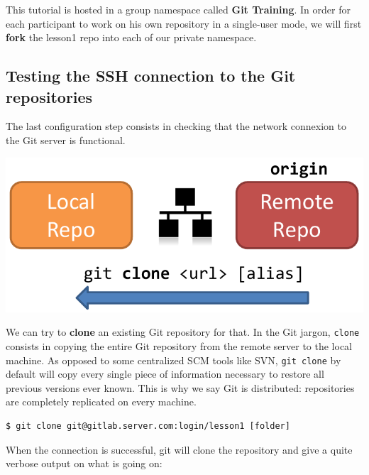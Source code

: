 \documentclass{tufte-handout}
\begin{document}
This tutorial is hosted in a group namespace called \textbf{Git Training}.
In order for each participant to work on his own repository in a single-user mode, we will first \textbf{fork} the lesson1 repo into each of our private namespace.

\subsection{Testing the SSH connection to the Git repositories}

The last configuration step consists in checking  that the network connexion to the Git server is functional.
\begin{marginfigure}%
  \centering
  \includegraphics[width=\linewidth]{gitclone-schema.pdf}
  \label{fig:gitclone}
\end{marginfigure}
We can try to \textbf{clone} an existing Git repository for that.
In the Git jargon, \texttt{clone} consists in copying the entire Git repository from the remote server to the local machine.
As opposed to some centralized SCM tools like SVN, \texttt{git clone} by default will copy every single piece of information necessary to restore all previous versions ever known.
This is why we say Git is distributed: repositories are completely replicated on every machine.

\begin{lstlisting}[style=BashInputStyle]
  $ git clone git@gitlab.server.com:login/lesson1 [folder]
\end{lstlisting}

\noindent When the connection is successful, git will clone the repository and give a quite verbose output on what is going on:
\end{document}
